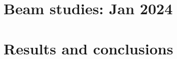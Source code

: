 \begin{refsection}
\section{Beam studies: Jan 2024}

\section{Results and conclusions}

\cite{X17:1996} \cite{X17:nuclear:2004} \cite{X17:Krasznahorkay:2015} \cite{X17:Ellwanger:2016} \cite{X17:Feng:2016} \cite{X17_Kozaczuk:2017} \cite{X17:Krasznahorkay:2017} \cite{X17:2019} \cite{X17:2021} 

\printbibliography[
    heading = bibliographychapter,
    title=Bibliography on X17
]

\end{refsection}
